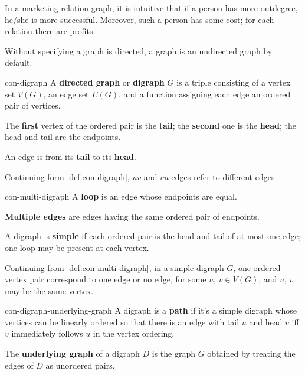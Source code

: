 \documentclass[../src/handouts/main.tex]{subfiles}
\begin{document}
In a marketing relation graph, it is intuitive that if a person has more outdegree, he/she is more successful. Moreover, such a person has some cost; for each relation there are profits.

Without specifying a graph is directed, a graph is an undirected graph by default.

\begin{definition}{}{con-digraph}
  A \textbf{directed graph} or \textbf{digraph} $G$ is a triple consisting of a vertex set $V(G)$, an edge set $E(G)$, and a function assigning each edge an ordered pair of vertices.

  The \textbf{first} vertex of the ordered pair is the \textbf{tail}; the \textbf{second} one is the \textbf{head}; the head and tail are the endpoints.

  An edge is from its \textbf{tail} to its \textbf{head}.
\end{definition}

Continuing form \cref{def:con-digraph}, $uv$ and $vu$ edges refer to different edges. 

\begin{definition}{}{con-multi-digraph}
  A \textbf{loop} is an edge whose endpoints are equal.

  \textbf{Multiple edges} are edges having the same ordered pair of endpoints.

  A digraph is \textbf{simple} if each ordered pair is the head and tail of at most one edge; one loop may be present at each vertex.
\end{definition}

Continuing from \cref{def:con-multi-digraph}, in a simple digraph $G$, one ordered vertex pair correspond to one edge or no edge, for some $u,\, v \in V(G)$, and $u,\, v$ may be the same vertex.

\begin{definition}{}{con-digraph-underlying-graph}
  A digraph is a \textbf{path} if it's a simple digraph whose vertices can be linearly ordered so that there is an edge with tail $u$ and head $v$ iff $v$ immediately follows $u$ in the vertex ordering.

  The \textbf{underlying graph} of a digraph $D$ is the graph $G$ obtained by treating the edges of $D$ as unordered pairs.
\end{definition}
\end{document}
